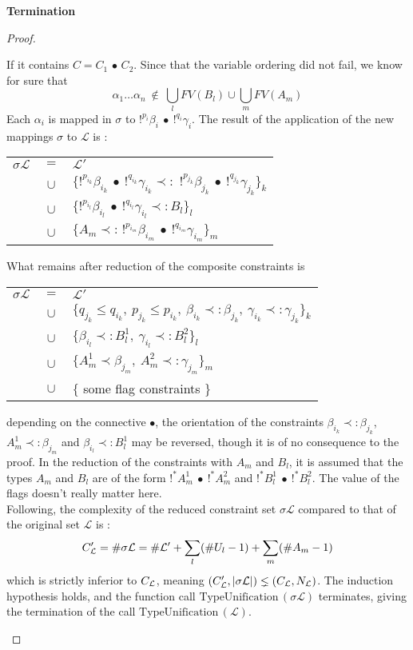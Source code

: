 \begin{thm}{\bf Termination}
\begin{proof}
\begin{itemize}
				If it contains $C = C_1 \,\bullet\, C_2$. Since that the variable ordering did not fail, we know for sure that
						$$\alpha_1 \dots \alpha_n ~ \notin ~ \bigcup_{l} FV(B_l) \cup \bigcup_{m} FV(A_m)$$
				Each $\alpha_i$ is mapped in $\sigma$ to $!^{p_i} \beta_i ~ \bullet ~ !^{q_i}\gamma_i$.
				The result of the application of the new mappings $\sigma$ to $\mathcal{L}$ is :
			  	\begin{center}
			  	\begin{tabular}{lcl}
			  		$\sigma \mathcal{L}$ & $ = $ & $\mathcal{L'}$ \\
				  	& $ \cup $ & $\{!^{p_{i_k}} \beta_{i_k} ~ \bullet ~ !^{q_{i_k}}\gamma_{i_k} \prec: \,
				  	              \,!^{p_{j_k}} \beta_{j_k} ~ \bullet ~ !^{q_{j_k}}\gamma_{j_k} \}_k$ \\
				  	& $ \cup $ & $\{!^{p_{i_l}} \beta_{i_l} ~ \bullet ~ !^{q_{i_l}}\gamma_{i_l} \prec: B_l \}_l$ \\
				  	& $ \cup $ & $\{ A_m \prec: \,!^{p_{i_m}} \beta_{i_m} ~ \bullet ~ !^{q_{i_m}}\gamma_{i_m} \}_m$
				  \end{tabular}
				  \end{center}
       	What remains after reduction of the composite constraints is
					\begin{center}
			  	\begin{tabular}{lcl}
			  		$\sigma \mathcal{L}$ & $ = $ & $\mathcal{L'}$ \\
			  		& $ \cup $ & $\{q_{j_k} \le q_{i_k}, ~p_{j_k} \le p_{i_k}, ~\beta_{i_k} \prec: \beta_{j_k}, ~\gamma_{i_k} \prec: \gamma_{j_k} \}_k$ \\
			  		& $ \cup $ & $\{ \beta_{i_l} \prec: B^1_l, ~ \gamma_{i_l} \prec: B^2_l \}_l$ \\
			  		& $ \cup $ & $\{ A^1_m \prec \beta_{j_m}, ~ A^2_m \prec: \gamma_{j_m} \}_m$ \\
			  		& $ \cup $ & $\{$ some flag constraints $\}$
			  	\end{tabular}
			  	\end{center}
				depending on the connective $\bullet$, the orientation of the constraints $\beta_{i_k} \prec: \beta_{j_k}$,
				$A^1_m \prec: \beta_{j_m}$ and $\beta_{i_l} \prec: B^1_l$ may be reversed, though it is of no consequence to the proof.
			  In the reduction of the constraints with $A_m$ and $B_l$, it is assumed that the types $A_m$ and $B_l$ are of the form
			  $!^*A^1_m ~\bullet~ !^*A^2_m$ and $!^*B^1_l ~\bullet~ !^*B^2_l$. The value of the flags doesn't really matter here. \\
			  Following, the complexity of the reduced constraint set $\sigma \mathcal{L}$ compared to that of the original set $\mathcal{L}$ is :
			  	$$C_{\mathcal{L}}' = \#\sigma\mathcal{L} = \#\mathcal{L'} + \sum_{l} (\#U_l - 1) + \sum_{m} (\#A_m - 1) $$
			  which is strictly inferior to $C_{\mathcal{L}}$, meaning $(C_{\mathcal{L}}',|\sigma\mathcal{L}|) \lneq (C_{\mathcal{L}}, N_{\mathcal{L}})$.
			  The induction hypothesis holds, and the function call $\text{TypeUnification}\,(\sigma \mathcal{L})$ terminates,
			  giving the termination of the call $\text{TypeUnification}\,(\mathcal{L})$.
			  

\end{itemize}
\end{proof}
\end{thm}
